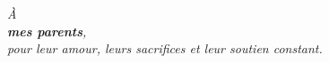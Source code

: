 \vspace*{\fill}
\begin{center}
  {\Large\itshape À\\[0.6em] \textbf{mes parents},\\[0.6em]
  pour leur amour, leurs sacrifices et leur soutien constant.}
\end{center}
\vspace*{\fill}
